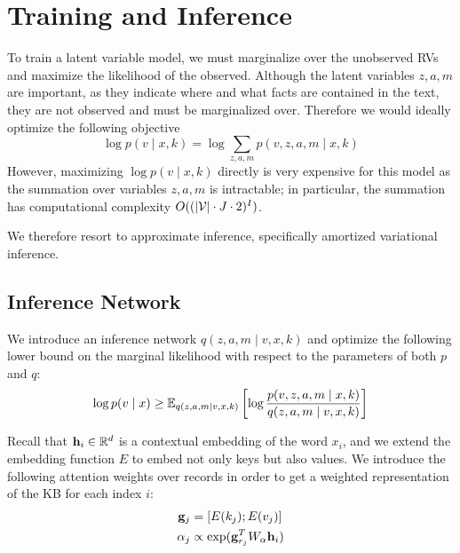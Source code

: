 \documentclass[12pt]{article}
\begin{document}
\section{Training and Inference}
To train a latent variable model, we must marginalize over the unobserved RVs
and maximize the likelihood of the observed.
Although the latent variables $z,a,m$ are important, as they indicate
where and what facts are contained in the text, they are not observed
and must be marginalized over.
Therefore we would ideally optimize the following objective
\begin{equation}
\log p(v \mid x,k) = \log \sum_{z,a,m} p(v,z,a,m \mid x,k)
\end{equation}
However, maximizing $\log p(v \mid x,k)$ directly is very expensive for this model
as the summation over variables $z,a,m$ is intractable;
in particular,
the summation has computational complexity $O((|\mathcal{V}|\cdot J\cdot 2)^{I})$.

We therefore resort to approximate inference,
specifically amortized variational inference.

\subsection{Inference Network}
We introduce an inference network $q(z,a,m\mid v,x,k)$
and optimize the following lower bound on the marginal likelihood
with respect to the parameters of both $p$ and $q$:
\begin{equation}
\label{eqn:lowerbound}
\log p(v\mid x) \geq
\mathbb{E}_{q(z,a,m\mid v,x,k)}\left[\log \frac{p(v,z,a,m\mid x,k)}{q(z,a,m\mid v,x,k)}\right]
\end{equation}

Recall that $\mathbf{h}_i \in \mathbb{R}^d$ is a contextual embedding of the word $x_i$,
and we extend the embedding function $E$ to embed not only keys but also values.
We introduce the following attention weights over records
in order to get a weighted representation
of the KB for each index $i$:
\begin{align}
\mathbf{g}_j &= [E(k_j); E(v_j)]\\
\alpha_j &\propto \exp(\mathbf{g}_{r_j}^T W_\alpha \mathbf{h}_i)
\end{align}
\end{document}
